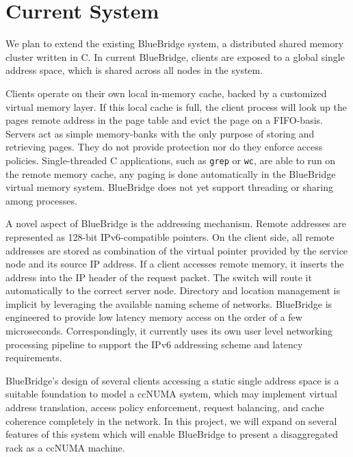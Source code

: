 \section{Current System}
\label{sec:current}
We plan to extend the existing BlueBridge system, a distributed shared
memory cluster written in C. In current BlueBridge, clients are
exposed to a global single address space, which is shared across all
nodes in the system.

Clients operate on their own local in-memory cache, backed by a
customized virtual memory layer. If this local cache is full, the
client process will look up the pages remote address in the page table
and evict the page on a FIFO-basis.  Servers act as simple
memory-banks with the only purpose of storing and retrieving pages.
They do not provide protection nor do they enforce access policies.
Single-threaded C applications, such as \texttt{grep} or \texttt{wc},
are able to run on the remote memory cache, any paging is done
automatically in the BlueBridge virtual memory system.  BlueBridge
does not yet support threading or sharing among processes.

A novel aspect of BlueBridge is the addressing mechanism. Remote
addresses are represented as 128-bit IPv6-compatible pointers. On the
client side, all remote addresses are stored as combination of the
virtual pointer provided by the service node and its source IP
address. If a client accesses remote memory, it inserts the address
into the IP header of the request packet. The switch will route it
automatically to the correct server node. Directory and location
management is implicit by leveraging the available naming scheme of
networks.  BlueBridge is engineered to provide low latency memory
access on the order of a few microseconds. Correspondingly, it
currently uses its own user level networking processing pipeline to
support the IPv6 addressing scheme and latency requirements.

BlueBridge's design of several clients accessing a static single
address space is a suitable foundation to model a ccNUMA system, which may
implement virtual address translation, access policy enforcement,
request balancing, and cache coherence completely in the network.
In this project, we will expand on several features of this system
which will enable BlueBridge to present a disaggregated rack as a ccNUMA
machine.
